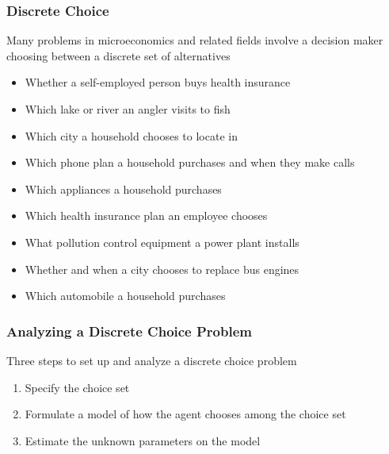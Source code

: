 \documentclass{beamer}\usepackage[]{graphicx}\usepackage[]{color}
\begin{document}
\begin{frame}\frametitle{Discrete Choice}
    Many problems in microeconomics and related fields involve a decision maker choosing between a discrete set of alternatives
    \begin{itemize}
    	\item Whether a self-employed person buys health insurance
    	\item Which lake or river an angler visits to fish
    	\item Which city a household chooses to locate in
    	\item Which phone plan a household purchases and when they make calls
    	\item Which appliances a household purchases
    	\item Which health insurance plan an employee chooses
    	\item What pollution control equipment a power plant installs
    	\item Whether and when a city chooses to replace bus engines
    	\item Which automobile a household purchases
    \end{itemize}
\end{frame}

\begin{frame}\frametitle{Analyzing a Discrete Choice Problem}
    Three steps to set up and analyze a discrete choice problem
    \begin{enumerate}
    	\item Specify the choice set
    	\item Formulate a model of how the agent chooses among the choice set
    	\item Estimate the unknown parameters on the model
    \end{enumerate}
\end{frame}
\end{document}
